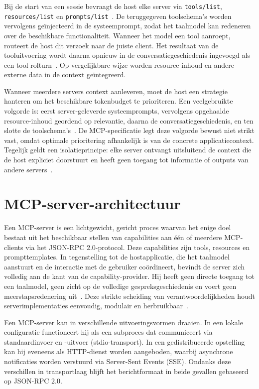 Bij de start van een sessie bevraagt de host elke server via \texttt{tools/list}, \texttt{resources/list} en \texttt{prompts/list}~\cite{Sekar2026MCP}. De teruggegeven toolschema's worden vervolgens geïnjecteerd in de systeemprompt, zodat het taalmodel kan redeneren over de beschikbare functionaliteit. Wanneer het model een tool aanroept, routeert de host dit verzoek naar de juiste client. Het resultaat van de tooluitvoering wordt daarna opnieuw in de conversatiegeschiedenis ingevoegd als een tool-rolturn~\cite{mcpspec2025architecture}. Op vergelijkbare wijze worden resource-inhoud en andere externe data in de context geïntegreerd.

Wanneer meerdere servers context aanleveren, moet de host een strategie hanteren om het beschikbare tokenbudget te prioriteren. Een veelgebruikte volgorde is: eerst server-geleverde systeemprompts, vervolgens opgehaalde resource-inhoud geordend op relevantie, daarna de conversatiegeschiedenis, en ten slotte de toolschema's~\cite{Ray_2025}. De MCP-specificatie legt deze volgorde bewust niet strikt vast, omdat optimale prioritering afhankelijk is van de concrete applicatiecontext. Tegelijk geldt een isolatieprincipe: elke server ontvangt uitsluitend de context die de host expliciet doorstuurt en heeft geen toegang tot informatie of outputs van andere servers~\cite{mcpspec2025architecture}.

\section{MCP-server-architectuur}\label{sec:mcp-server}

Een MCP-server is een lichtgewicht, gericht proces waarvan het enige doel bestaat uit het beschikbaar stellen van capabilities aan één of meerdere MCP-clients via het JSON-RPC 2.0-protocol. Deze capabilities zijn tools, resources en prompttemplates. In tegenstelling tot de hostapplicatie, die het taalmodel aanstuurt en de interactie met de gebruiker coördineert, bevindt de server zich volledig aan de kant van de capability-provider. Hij heeft geen directe toegang tot een taalmodel, geen zicht op de volledige gespreksgeschiedenis en voert geen meerstapsredenering uit~\cite{mcpspec2025architecture}. Deze strikte scheiding van verantwoordelijkheden houdt serverimplementaties eenvoudig, modulair en herbruikbaar~\cite{Sekar2026MCP}.

Een MCP-server kan in verschillende uitvoeringsvormen draaien. In een lokale configuratie functioneert hij als een subproces dat communiceert via standaardinvoer en -uitvoer (stdio-transport). In een gedistribueerde opstelling kan hij eveneens als HTTP-dienst worden aangeboden, waarbij asynchrone notificaties worden verstuurd via Server-Sent Events (SSE). Ondanks deze verschillen in transportlaag blijft het berichtformaat in beide gevallen gebaseerd op JSON-RPC 2.0.

